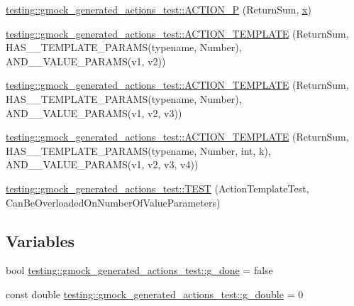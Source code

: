 \begin{DoxyCompactItemize}
\item 
\mbox{\hyperlink{namespacetesting_1_1gmock__generated__actions__test_acae7628c76df0e3b54ea80459fe3cf60}{testing\+::gmock\+\_\+generated\+\_\+actions\+\_\+test\+::\+A\+C\+T\+I\+O\+N\+\_\+P}} (Return\+Sum, \mbox{\hyperlink{_obj__test_2lib_2googletest-master_2googlemock_2test_2gmock-matchers__test_8cc_a6150e0515f7202e2fb518f7206ed97dc}{x}})
\item 
\mbox{\hyperlink{namespacetesting_1_1gmock__generated__actions__test_a0d95dcce021580cf2a2af2a91348a01b}{testing\+::gmock\+\_\+generated\+\_\+actions\+\_\+test\+::\+A\+C\+T\+I\+O\+N\+\_\+\+T\+E\+M\+P\+L\+A\+TE}} (Return\+Sum, H\+A\+S\+\_\+\_\+\+T\+E\+M\+P\+L\+A\+T\+E\+\_\+\+P\+A\+R\+A\+MS(typename, Number), A\+N\+D\+\_\+\_\+\+V\+A\+L\+U\+E\+\_\+\+P\+A\+R\+A\+MS(v1, v2))
\item 
\mbox{\hyperlink{namespacetesting_1_1gmock__generated__actions__test_a5241672e22af49093d3601ac42c9a5ca}{testing\+::gmock\+\_\+generated\+\_\+actions\+\_\+test\+::\+A\+C\+T\+I\+O\+N\+\_\+\+T\+E\+M\+P\+L\+A\+TE}} (Return\+Sum, H\+A\+S\+\_\+\_\+\+T\+E\+M\+P\+L\+A\+T\+E\+\_\+\+P\+A\+R\+A\+MS(typename, Number), A\+N\+D\+\_\+\_\+\+V\+A\+L\+U\+E\+\_\+\+P\+A\+R\+A\+MS(v1, v2, v3))
\item 
\mbox{\hyperlink{namespacetesting_1_1gmock__generated__actions__test_a03e55dabaa60ff2cda602c702ef3ff76}{testing\+::gmock\+\_\+generated\+\_\+actions\+\_\+test\+::\+A\+C\+T\+I\+O\+N\+\_\+\+T\+E\+M\+P\+L\+A\+TE}} (Return\+Sum, H\+A\+S\+\_\+\_\+\+T\+E\+M\+P\+L\+A\+T\+E\+\_\+\+P\+A\+R\+A\+MS(typename, Number, int, k), A\+N\+D\+\_\+\_\+\+V\+A\+L\+U\+E\+\_\+\+P\+A\+R\+A\+MS(v1, v2, v3, v4))
\item 
\mbox{\hyperlink{namespacetesting_1_1gmock__generated__actions__test_aa84c5b4f29e052340459e12649ce7209}{testing\+::gmock\+\_\+generated\+\_\+actions\+\_\+test\+::\+T\+E\+ST}} (Action\+Template\+Test, Can\+Be\+Overloaded\+On\+Number\+Of\+Value\+Parameters)
\end{DoxyCompactItemize}
\subsection*{Variables}
\begin{DoxyCompactItemize}
\item 
bool \mbox{\hyperlink{namespacetesting_1_1gmock__generated__actions__test_a5f828d39e27f0615498d5aa31c96916e}{testing\+::gmock\+\_\+generated\+\_\+actions\+\_\+test\+::g\+\_\+done}} = false
\item 
const double \mbox{\hyperlink{namespacetesting_1_1gmock__generated__actions__test_aa10d8101300a51dd20ab028fa9971313}{testing\+::gmock\+\_\+generated\+\_\+actions\+\_\+test\+::g\+\_\+double}} = 0
\end{DoxyCompactItemize}
